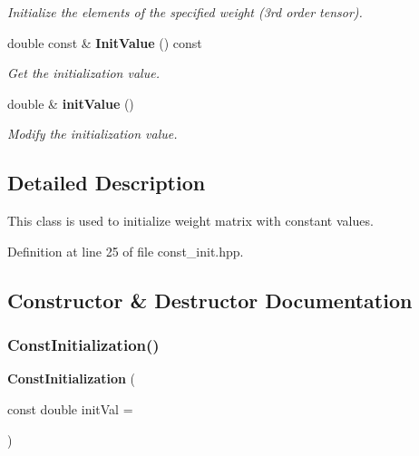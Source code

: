 \begin{DoxyCompactItemize}
\begin{DoxyCompactList}\small\item\em Initialize the elements of the specified weight (3rd order tensor). \end{DoxyCompactList}\item 
double const  \& \textbf{ Init\+Value} () const
\begin{DoxyCompactList}\small\item\em Get the initialization value. \end{DoxyCompactList}\item 
double \& \textbf{ init\+Value} ()
\begin{DoxyCompactList}\small\item\em Modify the initialization value. \end{DoxyCompactList}\end{DoxyCompactItemize}


\subsection{Detailed Description}
This class is used to initialize weight matrix with constant values. 

Definition at line 25 of file const\+\_\+init.\+hpp.



\subsection{Constructor \& Destructor Documentation}
\mbox{\label{classmlpack_1_1ann_1_1ConstInitialization_ac235c11e6009ac9fc7418e772113c5b0}} 
\subsubsection{Const\+Initialization()}
{\footnotesize\ttfamily \textbf{ Const\+Initialization} (\begin{DoxyParamCaption}\item[{const double}]{init\+Val = {} }\end{DoxyParamCaption})\hspace{0.3cm}{\ttfamily [inline]}}



